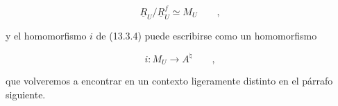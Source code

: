 \begin{equation}\tag{13.5.12}
 \underline R_U/\underline R^f_U\simeq M_U
 \qquad ,
\end{equation}

\noindent
y el homomorfismo $i$ de (13.3.4) puede escribirse como un homomorfismo

\begin{equation}\tag{13.5.13}
 i:M_U\longrightarrow A^\natural
 \qquad ,
\end{equation}

\noindent
que volveremos a encontrar en un contexto ligeramente distinto en el
párrafo siguiente.
